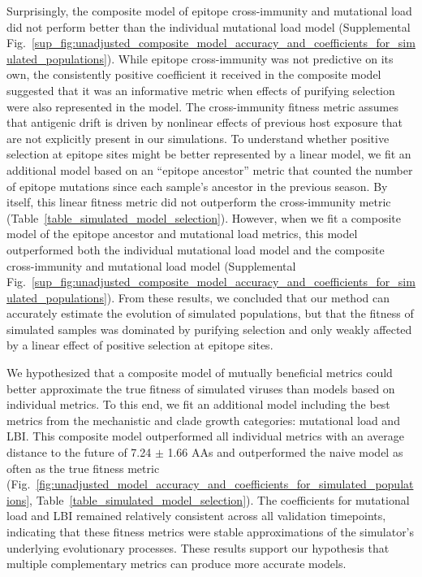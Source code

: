 Surprisingly, the composite model of epitope cross-immunity and mutational load did not perform better than the individual mutational load model (Supplemental Fig.~\ref{sup_fig:unadjusted_composite_model_accuracy_and_coefficients_for_simulated_populations}).
While epitope cross-immunity was not predictive on its own, the consistently positive coefficient it received in the composite model suggested that it was an informative metric when effects of purifying selection were also represented in the model.
The cross-immunity fitness metric assumes that antigenic drift is driven by nonlinear effects of previous host exposure \cite{Luksza:2014hj} that are not explicitly present in our simulations.
To understand whether positive selection at epitope sites might be better represented by a linear model, we fit an additional model based on an ``epitope ancestor'' metric that counted the number of epitope mutations since each sample's ancestor in the previous season.
By itself, this linear fitness metric did not outperform the cross-immunity metric (Table~\ref{table_simulated_model_selection}).
However, when we fit a composite model of the epitope ancestor and mutational load metrics, this model outperformed both the individual mutational load model and the composite cross-immunity and mutational load model (Supplemental Fig.~\ref{sup_fig:unadjusted_composite_model_accuracy_and_coefficients_for_simulated_populations}).
From these results, we concluded that our method can accurately estimate the evolution of simulated populations, but that the fitness of simulated samples was dominated by purifying selection and only weakly affected by a linear effect of positive selection at epitope sites.

We hypothesized that a composite model of mutually beneficial metrics could better approximate the true fitness of simulated viruses than models based on individual metrics.
To this end, we fit an additional model including the best metrics from the mechanistic and clade growth categories: mutational load and LBI.
This composite model outperformed all individual metrics with an average distance to the future of 7.24 $\pm$ 1.66 AAs and outperformed the naive model as often as the true fitness metric (Fig.~\ref{fig:unadjusted_model_accuracy_and_coefficients_for_simulated_populations}, Table~\ref{table_simulated_model_selection}).
The coefficients for mutational load and LBI remained relatively consistent across all validation timepoints, indicating that these fitness metrics were stable approximations of the simulator's underlying evolutionary processes.
These results support our hypothesis that multiple complementary metrics can produce more accurate models.

